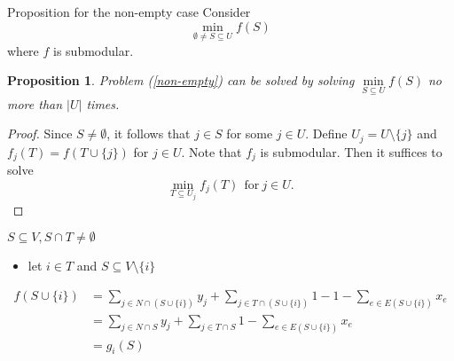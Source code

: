 \documentclass[usenames,dvipsnames]{beamer}
\newtheorem{prop}{Proposition}
\begin{document}
\begin{frame}{Proposition for the non-empty case}
  Consider \begin{equation}\min\limits_{\emptyset \neq S \subseteq U}
    f(S)\label{non-empty}\end{equation} where $f$ is submodular.
  \begin{prop}
    Problem (\ref{non-empty}) can be solved by solving $\min\limits_{S
      \subseteq U} f(S)$ no more than $|U|$ times.
  \end{prop}
  \begin{proof}
    Since $S \neq \emptyset$, it follows that $j \in S$ for some $j
    \in U$. Define $U_j = U \setminus \{j\}$ and $f_j(T) = f(T \cup
    \{j\})$ for $j \in U$. Note that $f_j$ is submodular. Then it
    suffices to solve \[\min\limits_{T \subseteq U_j}
    f_j(T)~~\text{for}~j \in U.\]
  \end{proof}
\end{frame}

\begin{frame}{$S \subseteq V, S \cap T \neq \emptyset$}
  \begin{itemize}
  \item let $i \in T$ and $S \subseteq V \setminus \{i\}$
  \end{itemize}
  \begin{align*}f(S \cup \{i\}) &= \sum\limits_{j \in N \cap (S \cup \{i\})} y_j + \sum\limits_{j \in T \cap (S \cup \{i\})} 1 - 1 - \sum\limits_{e \in E(S \cup \{i\})} x_e \\
    &= \sum\limits_{j \in N \cap S} y_j + \sum\limits_{j \in T \cap S} 1 - \sum\limits_{e \in E(S \cup \{i\})} x_e \\
    &= g_i(S)
  \end{align*}
\end{frame}
\end{document}
